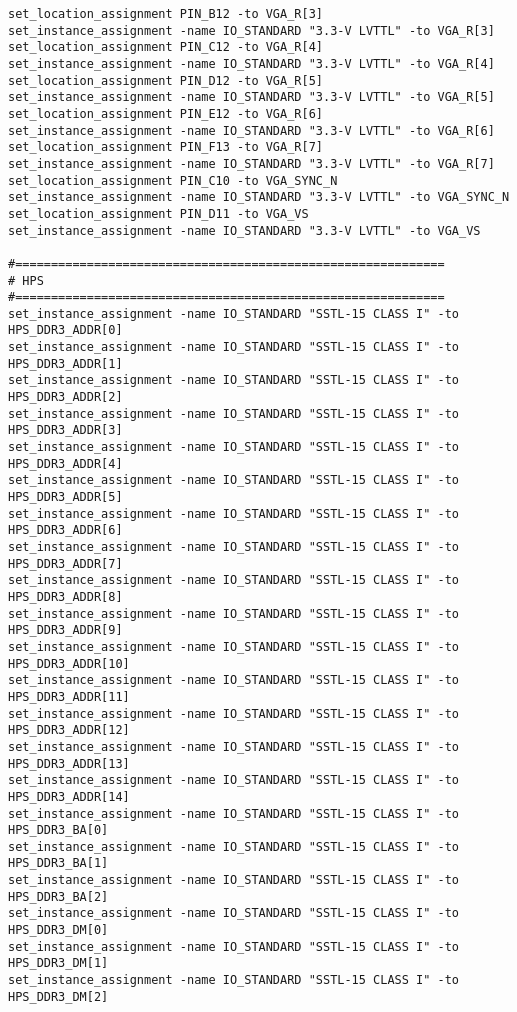 \documentclass[dvipdfm]{book}
\begin{document}
\begin{verbatim}
set_location_assignment PIN_B12 -to VGA_R[3]
set_instance_assignment -name IO_STANDARD "3.3-V LVTTL" -to VGA_R[3]
set_location_assignment PIN_C12 -to VGA_R[4]
set_instance_assignment -name IO_STANDARD "3.3-V LVTTL" -to VGA_R[4]
set_location_assignment PIN_D12 -to VGA_R[5]
set_instance_assignment -name IO_STANDARD "3.3-V LVTTL" -to VGA_R[5]
set_location_assignment PIN_E12 -to VGA_R[6]
set_instance_assignment -name IO_STANDARD "3.3-V LVTTL" -to VGA_R[6]
set_location_assignment PIN_F13 -to VGA_R[7]
set_instance_assignment -name IO_STANDARD "3.3-V LVTTL" -to VGA_R[7]
set_location_assignment PIN_C10 -to VGA_SYNC_N
set_instance_assignment -name IO_STANDARD "3.3-V LVTTL" -to VGA_SYNC_N
set_location_assignment PIN_D11 -to VGA_VS
set_instance_assignment -name IO_STANDARD "3.3-V LVTTL" -to VGA_VS

#============================================================
# HPS
#============================================================
set_instance_assignment -name IO_STANDARD "SSTL-15 CLASS I" -to HPS_DDR3_ADDR[0]
set_instance_assignment -name IO_STANDARD "SSTL-15 CLASS I" -to HPS_DDR3_ADDR[1]
set_instance_assignment -name IO_STANDARD "SSTL-15 CLASS I" -to HPS_DDR3_ADDR[2]
set_instance_assignment -name IO_STANDARD "SSTL-15 CLASS I" -to HPS_DDR3_ADDR[3]
set_instance_assignment -name IO_STANDARD "SSTL-15 CLASS I" -to HPS_DDR3_ADDR[4]
set_instance_assignment -name IO_STANDARD "SSTL-15 CLASS I" -to HPS_DDR3_ADDR[5]
set_instance_assignment -name IO_STANDARD "SSTL-15 CLASS I" -to HPS_DDR3_ADDR[6]
set_instance_assignment -name IO_STANDARD "SSTL-15 CLASS I" -to HPS_DDR3_ADDR[7]
set_instance_assignment -name IO_STANDARD "SSTL-15 CLASS I" -to HPS_DDR3_ADDR[8]
set_instance_assignment -name IO_STANDARD "SSTL-15 CLASS I" -to HPS_DDR3_ADDR[9]
set_instance_assignment -name IO_STANDARD "SSTL-15 CLASS I" -to HPS_DDR3_ADDR[10]
set_instance_assignment -name IO_STANDARD "SSTL-15 CLASS I" -to HPS_DDR3_ADDR[11]
set_instance_assignment -name IO_STANDARD "SSTL-15 CLASS I" -to HPS_DDR3_ADDR[12]
set_instance_assignment -name IO_STANDARD "SSTL-15 CLASS I" -to HPS_DDR3_ADDR[13]
set_instance_assignment -name IO_STANDARD "SSTL-15 CLASS I" -to HPS_DDR3_ADDR[14]
set_instance_assignment -name IO_STANDARD "SSTL-15 CLASS I" -to HPS_DDR3_BA[0]
set_instance_assignment -name IO_STANDARD "SSTL-15 CLASS I" -to HPS_DDR3_BA[1]
set_instance_assignment -name IO_STANDARD "SSTL-15 CLASS I" -to HPS_DDR3_BA[2]
set_instance_assignment -name IO_STANDARD "SSTL-15 CLASS I" -to HPS_DDR3_DM[0]
set_instance_assignment -name IO_STANDARD "SSTL-15 CLASS I" -to HPS_DDR3_DM[1]
set_instance_assignment -name IO_STANDARD "SSTL-15 CLASS I" -to HPS_DDR3_DM[2]

\end{verbatim}
\end{document}
